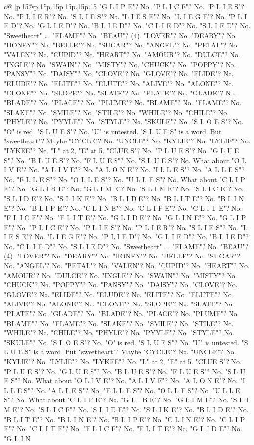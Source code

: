 \documentclass{article}
\begin{document}
{\begin{supertabular}{c@{$\;$}|p{.15\linewidth}@{}p{.15\linewidth}p{.15\linewidth}p{.15\linewidth}p{.15\linewidth}p{.15\linewidth}}
{{{"G L I P E"? No. "P L I C E"? No. "P L I E S"? No. "P L I E R"? No. "S L I E S"? No. "L I E S E"? No. "L I E G E"? No. "P L I E D"? No. "G L I E D"? No. "B L I E D"? No. "C L I E D"? No. "S L I E D"? No. "Sweetheart" ... "FLAME"? No. "BEAU"? (4). "LOVER"? No. "DEARY"? No. "HONEY"? No. "BELLE"? No. "SUGAR"? No. "ANGEL"? No. "PETAL"? No. "VALEN"? No. "CUPID"? No. "HEART"? No. "AMOUR"? No. "DULCE"? No. "INGLE"? No. "SWAIN"? No. "MISTY"? No. "CHUCK"? No. "POPPY"? No. "PANSY"? No. "DAISY"? No. "CLOVE"? No. "GLOVE"? No. "ELIDE"? No. "ELUDE"? No. "ELITE"? No. "ELUTE"? No. "ALIVE"? No. "ALONE"? No. "CLONE"? No. "SLOPE"? No. "SLATE"? No. "PLATE"? No. "GLADE"? No. "BLADE"? No. "PLACE"? No. "PLUME"? No. "BLAME"? No. "FLAME"? No. "SLAKE"? No. "SMILE"? No. "STILE"? No. "WHILE"? No. "CHILE"? No. "PHYLE"? No. "PYYLE"? No. "STYLE"? No. "SKULE"? No. "S L O E S"? No. "O" is red. "S L U E S"? No. "U" is untested. "S L U E S" is a word. But "sweetheart"? Maybe "CYCLE"? No. "UNCLE"? No. "KYLIE"? No. "LYLIE"? No. "LYKEE"? No. "L" at 2, "E" at 5. "CLUE S"? No. "P L U E S"? No. "G L U E S"? No. "B L U E S"? No. "F L U E S"? No. "S L U E S"? No. What about "O L I V E"? No. "A L I V E"? No. "A L O N E"? No. "I L L E S"? No. "A L L E S"? No. "E L L E S"? No. "O L L E S"? No. "U L L E S"? No. What about "C L I P E"? No. "G L I B E"? No. "G L I M E"? No. "S L I M E"? No. "S L I C E"? No. "S L I D E"? No. "S L I K E"? No. "B L I D E"? No. "B L I T E"? No. "B L I N E"? No. "B L I P E"? No. "C L I N E"? No. "C L I P E"? No. "C L I T E"? No. "F L I C E"? No. "F L I T E"? No. "G L I D E"? No. "G L I N E"? No. "G L I P E"? No. "P L I C E"? No. "P L I E S"? No. "P L I E R"? No. "S L I E S"? No. "L I E S E"? No. "L I E G E"? No. "P L I E D"? No. "G L I E D"? No. "B L I E D"? No. "C L I E D"? No. "S L I E D"? No. "Sweetheart" ... "FLAME"? No. "BEAU"? (4). "LOVER"? No. "DEARY"? No. "HONEY"? No. "BELLE"? No. "SUGAR"? No. "ANGEL"? No. "PETAL"? No. "VALEN"? No. "CUPID"? No. "HEART"? No. "AMOUR"? No. "DULCE"? No. "INGLE"? No. "SWAIN"? No. "MISTY"? No. "CHUCK"? No. "POPPY"? No. "PANSY"? No. "DAISY"? No. "CLOVE"? No. "GLOVE"? No. "ELIDE"? No. "ELUDE"? No. "ELITE"? No. "ELUTE"? No. "ALIVE"? No. "ALONE"? No. "CLONE"? No. "SLOPE"? No. "SLATE"? No. "PLATE"? No. "GLADE"? No. "BLADE"? No. "PLACE"? No. "PLUME"? No. "BLAME"? No. "FLAME"? No. "SLAKE"? No. "SMILE"? No. "STILE"? No. "WHILE"? No. "CHILE"? No. "PHYLE"? No. "PYYLE"? No. "STYLE"? No. "SKULE"? No. "S L O E S"? No. "O" is red. "S L U E S"? No. "U" is untested. "S L U E S" is a word. But "sweetheart"? Maybe "CYCLE"? No. "UNCLE"? No. "KYLIE"? No. "LYLIE"? No. "LYKEE"? No. "L" at 2, "E" at 5. "CLUE S"? No. "P L U E S"? No. "G L U E S"? No. "B L U E S"? No. "F L U E S"? No. "S L U E S"? No. What about "O L I V E"? No. "A L I V E"? No. "A L O N E"? No. "I L L E S"? No. "A L L E S"? No. "E L L E S"? No. "O L L E S"? No. "U L L E S"? No. What about "C L I P E"? No. "G L I B E"? No. "G L I M E"? No. "S L I M E"? No. "S L I C E"? No. "S L I D E"? No. "S L I K E"? No. "B L I D E"? No. "B L I T E"? No. "B L I N E"? No. "B L I P E"? No. "C L I N E"? No. "C L I P E"? No. "C L I T E"? No. "F L I C E"? No. "F L I T E"? No. "G L I D E"? No. "G L I N }}}
\end{supertabular}}
\end{document}
